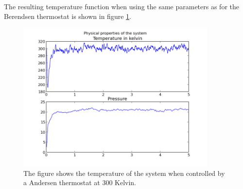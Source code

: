 \documentclass[12pt]{article}
\begin{document}
The resulting temperature function when using the same parameters as for the Berendsen thermostat is shown in figure \ref{fig:13}.

  \begin{figure}
\centering
\includegraphics[width=10cm]{andersenthermostat.png}
\caption{\label{fig:13} The figure shows the temperature of the system when controlled by a Andersen thermostat at 300 Kelvin.}
\end{figure}
 
\end{document}
